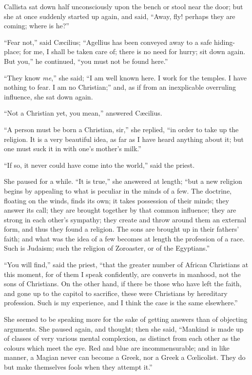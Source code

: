 Callista sat down half unconsciously upon the bench or stool near
the door; but she at once suddenly started up again, and said,
``Away, fly! perhaps they are coming; where is he?''

``Fear not,'' said Cæcilius; ``Agellius has been
conveyed away to a safe hiding-place; for me, I shall be taken care
of; there is no need for hurry; sit down again. But you,'' he
continued, ``you must not be found here.''

``They know \emph{me},'' she said; ``I am well known
here. I work for the temples. I have nothing to fear. I am no
Christian;'' and, as if from an inexplicable overruling influence,
she sat down again.

``Not a Christian yet, you mean,'' answered Cæcilius.

``A person must be born a Christian, sir,'' she replied,
``in order to take up the religion. It is a very beautiful idea,
as far as I have heard anything about it; but one must suck it in with
one's mother's milk.''

``If so, it never could have come into the world,'' said
the priest.

She paused for a while. ``It is true,'' she answered at length; ``but a new religion begins by appealing to what is
peculiar in the minds of a few. The doctrine, floating on the winds,
finds its own; it takes possession of their minds; they answer its
call; they are brought together by that common influence; they are
strong in each other's sympathy; they create and throw around them an
external form, and thus they found a religion. The sons are brought up
in their fathers' faith; and what was the idea of a few becomes at
length the profession of a race. Such is Judaism; such the religion of
Zoroaster, or of the Egyptians.''

``You will find,'' said the priest, ``that the greater
number of African Christians at this moment, for of them I speak
confidently, are converts in manhood, not the sons of Christians. On
the other hand, if there be those who have left the faith, and gone up
to the capitol to sacrifice, these were Christians by hereditary
profession. Such is my experience, and I think the case is the same
elsewhere.''

She seemed to be speaking more for the sake of getting answers than
of objecting arguments. She paused again, and thought; then she said,
``Mankind is made up of classes of very various mental complexion,
as distinct from each other as the colours which meet the eye. Red and
blue are incommensurable; and in like manner, a Magian never can
become a Greek, nor a Greek a Cœlicolist. They do but make themselves
fools when they attempt it.''

